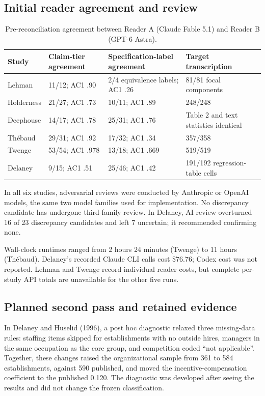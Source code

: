 \documentclass[11pt]{article}
\begin{document}
\subsection{Initial reader agreement and review}
\begin{table}[H]\centering\small
\begin{tabularx}{\linewidth}{@{}lYYY@{}}\toprule
Study & Claim-tier agreement & Specification-label agreement & Target transcription\\\midrule
Lehman & 11/12; AC1 .90 & 2/4 equivalence labels; AC1 .26 & 81/81 focal components\\
Holderness & 21/27; AC1 .73 & 10/11; AC1 .89 & 248/248\\
Deephouse & 14/17; AC1 .78 & 25/31; AC1 .76 & Table 2 and text statistics identical\\
Th\'ebaud & 29/31; AC1 .92 & 17/32; AC1 .34 & 357/358\\
Twenge & 53/54; AC1 .978 & 13/18; AC1 .669 & 519/519\\
Delaney & 9/15; AC1 .51 & 25/46; AC1 .42 & 191/192 regression-table cells\\\bottomrule
\end{tabularx}\caption{Pre-reconciliation agreement between Reader A (Claude Fable 5.1) and Reader B (GPT-6 Astra).}\end{table}
In all six studies, adversarial reviews were conducted by Anthropic or OpenAI models, the same two model families used for implementation. No discrepancy candidate has undergone third-family review. In Delaney, AI review overturned 16 of 23 discrepancy candidates and left 7 uncertain; it recommended confirming none.

Wall-clock runtimes ranged from 2 hours 24 minutes (Twenge) to 11 hours (Th\'ebaud). Delaney's recorded Claude CLI calls cost \$76.76; Codex cost was not reported. Lehman and Twenge record individual reader costs, but complete per-study API totals are unavailable for the other five runs.

\subsection{Planned second pass and retained evidence}
In Delaney and Huselid (1996), a post hoc diagnostic relaxed three missing-data rules: staffing items skipped for establishments with no outside hires, managers in the same occupation as the core group, and competition coded ``not applicable''. Together, these changes raised the organizational sample from 361 to 584 establishments, against 590 published, and moved the incentive-compensation coefficient to the published 0.120. The diagnostic was developed after seeing the results and did not change the frozen classification.
\end{document}
